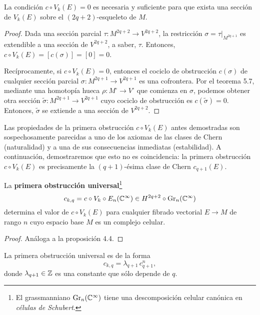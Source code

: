 \begin{theorem}
La condición $c \circ V_k(E) = 0$ es necesaria y suficiente para que exista una sección de $V_k(E)$ sobre el $(2q+2)$-esqueleto de $M$.
\end{theorem}

\begin{proof}
Dada una sección parcial $\tau : M^{2q+2} \to V^{2q+2}$, la restricción $\sigma = \tau \big \vert_{M^{2q+1}}$ es extendible a una sección de $V^{2q+2}$, a saber, $\tau$. Entonces, $c \circ V_k(E) = [c(\sigma)] = [0] = 0$.

Recíprocamente, si $c \circ V_k(E) = 0$, entonces el cociclo de obstrucción $c(\sigma)$ de cualquier sección parcial $\sigma : M^{2q+1} \to V^{2q+1}$ es una cofrontera. Por el teorema 5.7, mediante una homotopía hueca $\rho : M^\square \to V^\square$ que comienza en $\sigma$, podemos obtener otra sección $\widetilde \sigma : M^{2q+1} \to V^{2q+1}$ cuyo cociclo de obstrucción es $c(\widetilde \sigma) = 0$. Entonces, $\widetilde \sigma$ se extiende a una sección de $V^{2q+2}$.
\end{proof}

Las propiedades de la primera obstrucción $c \circ V_k(E)$ antes demostradas son sospechosamente parecidas a uno de los axiomas de las clases de Chern (naturalidad) y a una de sus consecuencias inmediatas (estabilidad). A continuación, demostraremos que esto no es coincidencia: la primera obstrucción $c \circ V_k(E)$ es precisamente la $(q+1)$-ésima clase de Chern $c_{q+1}(E)$.

\begin{proposition}
La \textbf{primera obstrucción universal}\footnote{El grassmanniano $\operatorname{Gr}_n(\mathbb C^\infty)$ tiene una descomposición celular canónica en \textit{células de Schubert}.}
$$c_{k,q} = c \circ V_k \circ E_n(\mathbb C^\infty) \in H^{2q+2} \circ \operatorname{Gr}_n(\mathbb C^\infty)$$
determina el valor de $c \circ V_k(E)$ para cualquier fibrado vectorial $E \to M$ de rango $n$ cuyo espacio base $M$ es un complejo celular.
\end{proposition}

\begin{proof}
Análoga a la proposición 4.4.
\end{proof}

\begin{proposition}
La primera obstrucción universal es de la forma
$$c_{k,q} = \lambda_{q+1} \, c_{q+1}^n,$$
donde $\lambda_{q+1} \in \mathbb Z$ es una constante que sólo depende de $q$.
\end{proposition}

